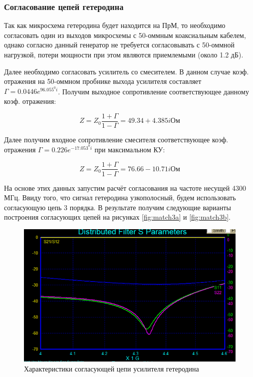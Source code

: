 \documentclass[utf8x, 14pt, oneside, a4paper]{article}
\begin{document}
			\subsubsection{Согласование цепей гетеродина}
				Так как микросхема гетеродина будет находится на ПрМ, то необходимо согласовать один из выходов микросхемы с 50-оммным коаксиальным кабелем, однако согласно \cite{bib:docs:CN-0285} данный генератор не требуется согласовывать с 50-оммной нагрузкой, потери мощности при этом являются приемлемыми (около 1.2 дБ). 
				
				Далее необходимо согласовать усилитель со смесителем. В данном случае коэф. отражения на 50-оммном пробнике выхода усилителя составляет $\Gamma=0.0446e^{96.055^{0}i}$. Получим выходное сопротивление соответствующее данному коэф. отражения:
				
				\begin{equation}
					\label{eq:Gam_amp3}
					Z=Z_{0}\frac{1+\Gamma}{1-\Gamma}=49.34+4.385i \text{Ом}
				\end{equation}
				
				Далее получим входное сопротивление смесителя соответствующее коэф. отражения $\Gamma=0.226e^{-17.053^{0}i}$ при максимальном КУ:
				
				\begin{equation}
					\label{eq:Gam_amp3a}
					Z=Z_{0}\frac{1+\Gamma}{1-\Gamma}=76.66-10.71i \text{Ом}
				\end{equation}
				
				На основе этих данных запустим расчёт согласования на частоте несущей 4300 МГц. Ввиду того, что сигнал гетеродина узкополосный, будем использовать согласующую цепь 3 порядка. В результате получим следующие варианты построения согласующих цепей на рисунках \ref{fig:match3a} и \ref{fig:match3b}. 
				
				\begin{figure}[H]
					\centering
					\includegraphics[width=0.7\linewidth]{"Рисунки/Графики/Согласование гетеродина"}
					\caption{{Характеристики согласующей цепи усилителя гетеродина}}
					\label{fig:graf:match3}
				\end{figure}
				
\end{document}
